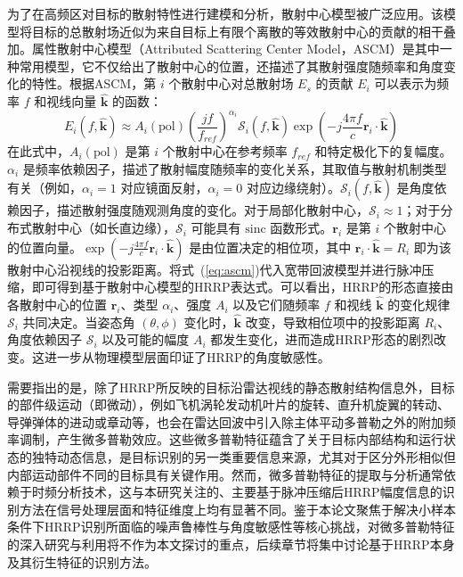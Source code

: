 为了在高频区对目标的散射特性进行建模和分析，散射中心模型被广泛应用。该模型将目标的总散射场近似为来自目标上有限个离散的等效散射中心的贡献的相干叠加。属性散射中心模型（Attributed Scattering Center Model，ASCM）是其中一种常用模型，它不仅给出了散射中心的位置，还描述了其散射强度随频率和角度变化的特性。根据ASCM，第 $i$ 个散射中心对总散射场 $E_s$ 的贡献 $E_i$ 可以表示为频率 $f$ 和视线向量 $\hat{\mathbf{k}}$ 的函数：
\begin{equation}
    E_i(f, \hat{\mathbf{k}}) \approx A_i(\text{pol}) \left(\frac{j f}{f_{ref}}\right)^{\alpha_i} \mathcal{S}_i(f, \hat{\mathbf{k}}) \exp\left(-j \frac{4\pi f}{c} \mathbf{r}_i \cdot \hat{\mathbf{k}}\right)
    \label{eq:ascm}
\end{equation}
在此式中，$A_i(\text{pol})$ 是第 $i$ 个散射中心在参考频率 $f_{ref}$ 和特定极化下的复幅度。$\alpha_i$ 是频率依赖因子，描述了散射幅度随频率的变化关系，其取值与散射机制类型有关（例如，$\alpha_i=1$ 对应镜面反射，$\alpha_i=0$ 对应边缘绕射）。$\mathcal{S}_i(f, \hat{\mathbf{k}})$ 是角度依赖因子，描述散射强度随观测角度的变化。对于局部化散射中心，$\mathcal{S}_i \approx 1$；对于分布式散射中心（如长直边缘），$\mathcal{S}_i$ 可能具有 $\text{sinc}$ 函数形式。$\mathbf{r}_i$ 是第 $i$ 个散射中心的位置向量。$\exp(-j \frac{4\pi f}{c} \mathbf{r}_i \cdot \hat{\mathbf{k}})$ 是由位置决定的相位项，其中 $\mathbf{r}_i \cdot \hat{\mathbf{k}} = R_i$ 即为该散射中心沿视线的投影距离。将式~(\ref{eq:ascm})代入宽带回波模型并进行脉冲压缩，即可得到基于散射中心模型的HRRP表达式。可以看出，HRRP的形态直接由各散射中心的位置 $\mathbf{r}_i$、类型 $\alpha_i$、强度 $A_i$ 以及它们随频率 $f$ 和视线 $\hat{\mathbf{k}}$ 的变化规律 $\mathcal{S}_i$ 共同决定。当姿态角 $(\theta, \phi)$ 变化时，$\hat{\mathbf{k}}$ 改变，导致相位项中的投影距离 $R_i$、角度依赖因子 $\mathcal{S}_i$ 以及可能的幅度 $A_i$ 都发生变化，进而造成HRRP形态的剧烈改变。这进一步从物理模型层面印证了HRRP的角度敏感性。

需要指出的是，除了HRRP所反映的目标沿雷达视线的静态散射结构信息外，目标的部件级运动（即微动），例如飞机涡轮发动机叶片的旋转、直升机旋翼的转动、导弹弹体的进动或章动等，也会在雷达回波中引入除主体平动多普勒之外的附加频率调制，产生微多普勒效应。这些微多普勒特征蕴含了关于目标内部结构和运行状态的独特动态信息，是目标识别的另一类重要信息来源，尤其对于区分外形相似但内部运动部件不同的目标具有关键作用。然而，微多普勒特征的提取与分析通常依赖于时频分析技术，这与本研究关注的、主要基于脉冲压缩后HRRP幅度信息的识别方法在信号处理层面和特征维度上均有显著不同。鉴于本论文聚焦于解决小样本条件下HRRP识别所面临的噪声鲁棒性与角度敏感性等核心挑战，对微多普勒特征的深入研究与利用将不作为本文探讨的重点，后续章节将集中讨论基于HRRP本身及其衍生特征的识别方法。

